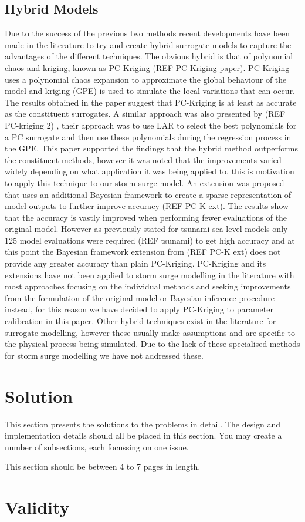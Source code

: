\documentclass[12pt,a4paper]{article}
\begin{document}
\subsection{Hybrid Models}
\noindent
Due to the success of the previous two methods recent developments have been made in the literature to try and create hybrid surrogate models to capture the advantages of the different techniques. The obvious hybrid is that of polynomial chaos and kriging, known as PC-Kriging (REF PC-Kriging paper). PC-Kriging uses a polynomial chaos expansion to approximate the global behaviour of the model and kriging (GPE) is used to simulate the local variations that can occur. The results obtained in the paper suggest that PC-Kriging is at least as accurate as the constituent surrogates. A similar approach was also presented by (REF PC-kriging 2) , their approach was to use LAR to select the best polynomials for a PC surrogate and then use these polynomials during the regression process in the GPE. This paper supported the findings that the hybrid method outperforms the constituent methods, however it was noted that the improvements varied widely depending on what application it was being applied to, this is motivation to apply this technique to our storm surge model. An extension was proposed that uses an additional Bayesian framework to create a sparse representation of model outputs to further improve accuracy (REF PC-K ext). The results show that the accuracy is vastly improved when performing fewer evaluations of the original model. However as previously stated for tsunami sea level models only 125 model evaluations were required (REF tsunami) to get high accuracy and at this point the Bayesian framework extension from (REF PC-K ext) does not provide any greater accuracy than plain PC-Kriging. PC-Kriging and its extensions have not been applied to storm surge modelling in the literature with most approaches focusing on the individual methods and seeking improvements from the formulation of the original model or Bayesian inference procedure instead, for this reason we have decided to apply PC-Kriging to parameter calibration in this paper. Other hybrid techniques exist in the literature for surrogate modelling, however these usually make assumptions and are specific to the physical process being simulated. Due to the lack of these specialised methods for storm surge modelling we have not addressed these.

\section{Solution} \label{sec:sol}

This section presents the solutions to the problems in detail.  The design and implementation details should all be placed in this section.  You may create a number of subsections, each focussing on one issue.  

This section should be between 4 to 7 pages in length.

\section{Validity} \label{sec:val}


\end{document}
